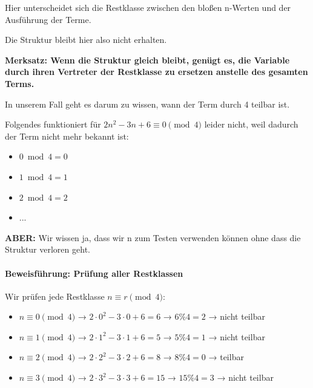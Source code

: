 \documentclass{article}
\begin{document}
      
Hier unterscheidet sich die Restklasse zwischen den bloßen n-Werten und der Ausführung der Terme.

      
Die Struktur bleibt hier also nicht erhalten.


      \textbf{
        Merksatz: Wenn die Struktur gleich bleibt, genügt es, die Variable durch ihren Vertreter der Restklasse zu ersetzen anstelle des gesamten Terms.
      }

      
In unserem Fall geht es darum zu wissen, wann der Term durch 4 teilbar ist.
      


      
Folgendes funktioniert für $2n^2 - 3n + 6 \equiv 0 \pmod{4}$ leider nicht, weil dadurch der Term nicht mehr bekannt ist:


      \begin{itemize}
        \item $0 \bmod 4 = 0$

        \item $1 \bmod 4 = 1$

        \item $2 \bmod 4 = 2$

        \item ...

      \end{itemize}

      
\textbf{ABER:} Wir wissen ja, dass wir n zum Testen verwenden können ohne dass die Struktur verloren geht.


      \paragraph{Beweisführung: Prüfung aller Restklassen}
      
Wir prüfen jede Restklasse $n \equiv r \pmod{4}$:


        \begin{itemize}


      
        \item $n \equiv 0 \pmod{4}$ → $2\cdot0^2 - 3\cdot0 + 6 = 6$ → $6 \% 4 = 2$ → nicht teilbar

        \item $n \equiv 1 \pmod{4}$ → $2\cdot1^2 - 3\cdot1 + 6 = 5$ → $5 \% 4 = 1$ → nicht teilbar

        \item $n \equiv 2 \pmod{4}$ → $2\cdot2^2 - 3\cdot2 + 6 = 8$ → $8 \% 4 = 0$ → teilbar

        \item $n \equiv 3 \pmod{4}$ → $2\cdot3^2 - 3\cdot3 + 6 = 15$ → $15 \% 4 = 3$ → nicht teilbar

      \end{itemize}
\end{document}
